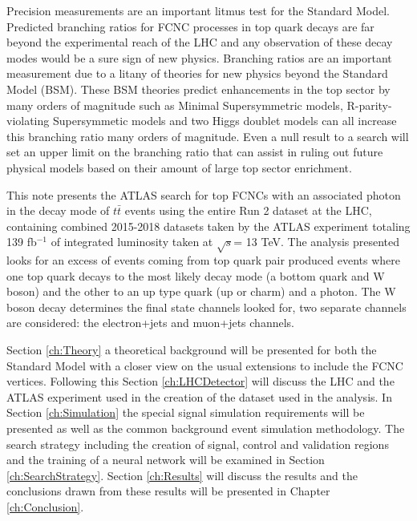 Precision measurements are an important litmus test for the Standard Model.  Predicted branching ratios for FCNC processes in top quark decays are far beyond the experimental reach of the LHC and any observation of these decay modes would be a sure sign of new physics.  Branching ratios are an important measurement due to a litany of theories for new physics beyond the Standard Model (BSM).  These BSM theories predict enhancements in the top sector by many orders of magnitude such as Minimal Supersymmetric models\cite{MSSM}, R-parity-violating Supersymmetic models\cite{RPVSUSY} and two Higgs doublet models\cite{2HDM} can all increase this branching ratio many orders of magnitude.  Even a null result to a search will set an upper limit on the branching ratio that can assist in ruling out future physical models based on their amount of large top sector enrichment.

This note presents the ATLAS search for top FCNCs with an associated photon in the decay mode of $t\bar{t}$ events using the entire Run 2 dataset at the LHC, containing combined 2015-2018 datasets taken by the ATLAS experiment totaling 139 fb$^{-1}$ of integrated luminosity taken at $\sqrt{s}$= 13 TeV.  The analysis presented looks for an excess of events coming from top quark pair produced events where one top quark decays to the most likely decay mode (a bottom quark and W boson) and the other to an up type quark (up or charm) and a photon.  The W boson decay determines the final state channels looked for, two separate channels are considered: the electron+jets and muon+jets channels. 

Section \ref{ch:Theory} a theoretical background will be presented for both the Standard Model with a closer view on the usual extensions to include the FCNC vertices.  Following this  Section \ref{ch:LHCDetector} will discuss the LHC and the ATLAS experiment used in the creation of the dataset used in the analysis.  In Section \ref{ch:Simulation} the special signal simulation requirements will be presented as well as the common background event simulation methodology.  The search strategy including the creation of signal, control and validation regions and the training of a neural network will be examined in Section \ref{ch:SearchStrategy}.  Section \ref{ch:Results} will discuss the results and the conclusions drawn from these results will be presented in Chapter \ref{ch:Conclusion}.